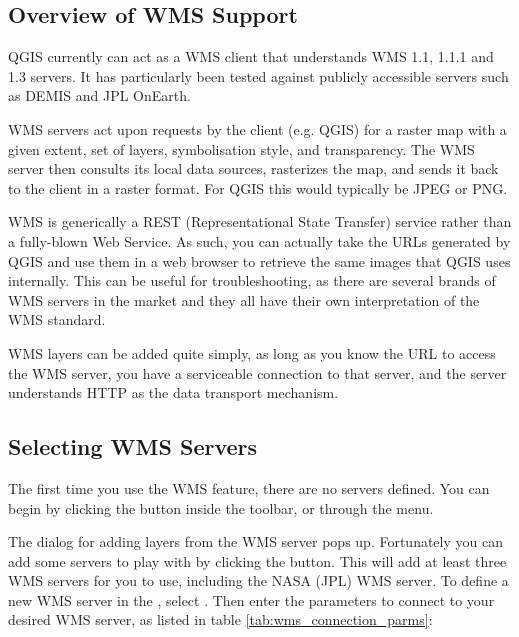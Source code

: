 \subsection{Overview of WMS Support}\label{sec:ogc-wms-about}

QGIS currently can act as a WMS client that understands WMS 1.1, 1.1.1 and 1.3
servers.  It has particularly been tested against publicly accessible servers
such as DEMIS and JPL OnEarth.

WMS servers act upon requests by the client (e.g. QGIS) for a raster map with
a given extent, set of layers, symbolisation style, and transparency.  The WMS
server then consults its local data sources, rasterizes the map, and sends
it back to the client in a raster format.  For QGIS this would typically
be JPEG or PNG.

WMS is generically a REST (Representational State Transfer) service rather than
a fully-blown Web Service.  As such, you can actually take the URLs generated by
QGIS and use them in a web browser to retrieve the same images that QGIS uses
internally.  This can be useful for troubleshooting, as there are
several brands of WMS servers in the market and they all have their own
interpretation of the WMS standard.

WMS layers can be added quite simply, as long as you know the URL to access
the WMS server, you have a serviceable connection to that server, and the
server understands HTTP as the data transport mechanism.

\subsection{Selecting WMS Servers}\label{sec:ogc-wms-servers}

The first time you use the WMS feature, there are no servers defined. You
can begin by clicking the  button inside the toolbar,
or through the  \arrow {} menu.

The dialog  for adding layers from the WMS server pops up. Fortunately you can
add some servers to play with by clicking the 
button. This will add at least three WMS servers for you to use, including the NASA (JPL)
WMS server. To define a new WMS server in the ,
select . Then enter the parameters to connect to your desired
WMS server, as listed in table \ref{tab:wms_connection_parms}:

